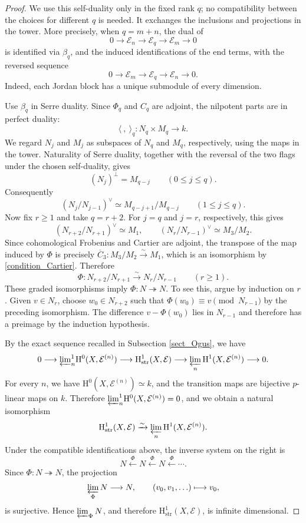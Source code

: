 \documentclass[12pt,a4]{amsart}
\theoremstyle{definition}
\begin{document}
\begin{proof}
We use this self-duality only in the fixed rank $q$; no compatibility between
the choices for different $q$ is needed. It exchanges the inclusions and
projections in the tower. More precisely, when $q=m+n$, the dual of
\[
0\longrightarrow\mathcal E_n\longrightarrow\mathcal E_q
\longrightarrow\mathcal E_m\longrightarrow0
\]
is identified via $\beta_q$, and the induced identifications of the end terms,
with the reversed sequence
\[
0\longrightarrow\mathcal E_m\longrightarrow\mathcal E_q
\longrightarrow\mathcal E_n\longrightarrow0.
\]
Indeed, each Jordan block has a unique submodule of every dimension.

Use $\beta_q$ in Serre duality. Since $\Phi_q$ and $C_q$ are adjoint, the
nilpotent parts are in perfect duality:
\[
\langle\ ,\ \rangle_q:N_q\times M_q\longrightarrow k.
\]
We regard $N_j$ and $M_j$ as subspaces of $N_q$ and $M_q$, respectively,
using the maps in the tower.  Naturality of Serre duality, together with
the reversal of the two flags under the chosen self-duality, gives
\[
(N_j)^\perp=M_{q-j}\qquad(0\leq j\leq q).
\]
Consequently
\[
(N_j/N_{j-1})^\vee\simeq M_{q-j+1}/M_{q-j}\qquad(1\leq j\leq q).
\]
Now fix $r\geq1$ and take $q=r+2$.  For $j=q$ and $j=r$, respectively,
this gives
\[
(N_{r+2}/N_{r+1})^\vee\simeq M_1,\qquad
(N_r/N_{r-1})^\vee\simeq M_3/M_2.
\]
Since cohomological Frobenius and Cartier are adjoint, the transpose of the
map induced by $\Phi$ is precisely
$\overline C_3:M_3/M_2\xrightarrow{\sim}M_1$, which is an isomorphism by
\eqref{condition_Cartier}. Therefore
\[
\Phi:N_{r+2}/N_{r+1}\xrightarrow{\sim}N_r/N_{r-1}
\qquad(r\geq1).
\]
These graded isomorphisms imply $\Phi:N\twoheadrightarrow N$. To see this,
argue by induction on $r$. Given $v\in N_r$, choose $w_0\in N_{r+2}$ such
that $\Phi(w_0)\equiv v\pmod{N_{r-1}}$ by the preceding isomorphism. The
difference $v-\Phi(w_0)$ lies in $N_{r-1}$
and therefore has a preimage by the induction hypothesis.

By the exact sequence recalled in Subsection \ref{sect_Ogus}, we have
\[
0\longrightarrow {\varprojlim}^{1}_n\mathrm H^0(X,\mathcal E^{(n)})
\longrightarrow \mathrm H^1_\mathrm{str}(X,\mathcal E)
\longrightarrow \varprojlim_n\mathrm H^1(X,\mathcal E^{(n)})
\longrightarrow 0.
\]
For every $n$, we have $\mathrm H^0(X,\mathcal E^{(n)})\simeq k$, and the transition maps are bijective $p$-linear maps on $k$. Therefore
${\varprojlim}^{1}_n\mathrm H^0(X,\mathcal E^{(n)})=0$, and we obtain a natural isomorphism
\[
\mathrm H^1_\mathrm{str}(X,\mathcal E)\xrightarrow{\sim}
\varprojlim_n \mathrm H^1(X,\mathcal E^{(n)}).
\]
Under the compatible identifications above, the inverse system on the right is
\[
N\xleftarrow{\Phi}N\xleftarrow{\Phi}N\xleftarrow{\Phi}\cdots .
\]
Since $\Phi:N\twoheadrightarrow N$, the projection
\[
\varprojlim_\Phi N\longrightarrow N,\qquad (v_0,v_1,\ldots)\longmapsto v_0,
\]
is surjective. Hence $\varprojlim_\Phi N$, and therefore
$\mathrm H^1_\mathrm{str}(X,\mathcal E)$, is infinite dimensional.
\end{proof}
\end{document}
